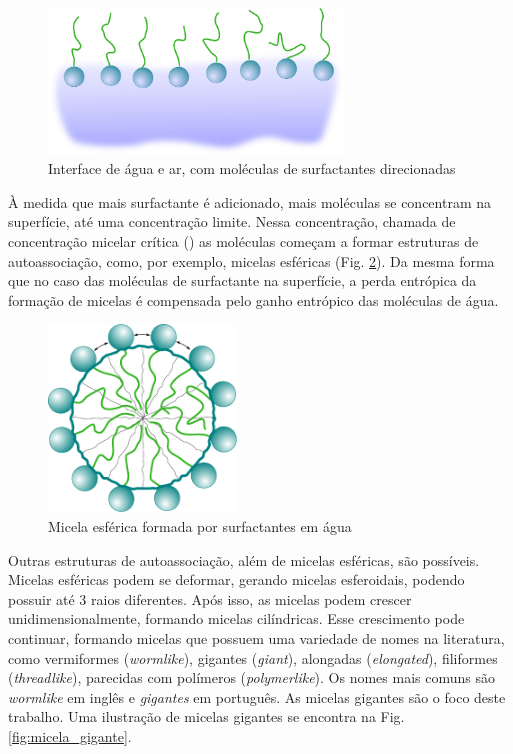 	\begin{figure}
		\centering
		\includegraphics[width=0.7\textwidth]{./imagens/introducao/superficie_surfactante}
		\caption{Interface de água e ar, com moléculas de surfactantes direcionadas}
		\label{fig:superficie_surfactante}
	\end{figure}
	
	À medida que mais surfactante é adicionado, mais moléculas se concentram na superfície, até uma concentração limite. Nessa concentração, chamada de concentração micelar crítica (\cmc) as moléculas começam a formar estruturas de autoassociação, como, por exemplo, micelas esféricas (Fig. \ref{fig:micela_esferica}). Da mesma forma que no caso das moléculas de surfactante na superfície, a perda entrópica da formação de micelas é compensada pelo ganho entrópico das moléculas de água. 
	
	
	\begin{figure}[H]
		\centering
		\includegraphics[width=5cm]{./imagens/introducao/micela_esferica}
		\caption{Micela esférica formada por surfactantes em água}
		\label{fig:micela_esferica}
	\end{figure}
	
	Outras estruturas de autoassociação, além de micelas esféricas, são possíveis. Micelas esféricas podem se deformar, gerando micelas esferoidais, podendo possuir até 3 raios diferentes. Após isso, as micelas podem crescer unidimensionalmente, formando micelas cilíndricas. Esse crescimento pode continuar, formando micelas que possuem uma variedade de nomes na literatura, como vermiformes (\emph{wormlike}), gigantes (\emph{giant}), alongadas (\emph{elongated}), filiformes (\emph{threadlike}), parecidas com polímeros (\emph{polymerlike}). Os nomes mais comuns são \emph{wormlike} em inglês e \emph{gigantes} em português. As micelas gigantes são o foco deste trabalho. Uma ilustração de micelas gigantes se encontra na Fig. \ref{fig:micela_gigante}.
		
